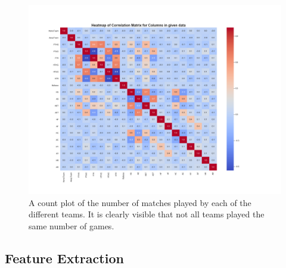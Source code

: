 \documentclass[a4paper,12pt]{article}
\begin{document}
	
	\begin{figure}[H]
		\renewcommand\thefigure{2.5}
		\centering
		
		\includegraphics[scale=0.35]{raw_corr_heatmap.png}
		\caption{A count plot of the number of matches played by each of the different teams. It is clearly visible that not all teams played the same number of games.}
	\end{figure}
	

	
	\subsection{Feature Extraction}
	
\end{document}
